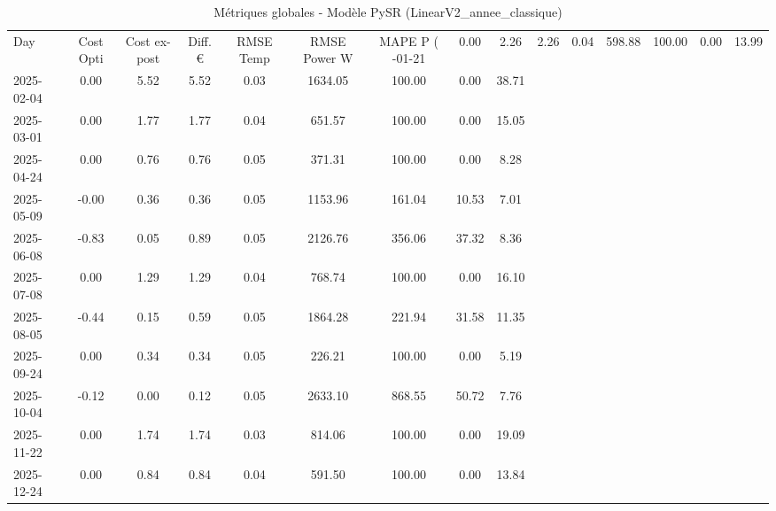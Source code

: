 \begin{table}
\caption{Métriques globales - Modèle PySR (LinearV2_annee_classique)}
\label{tab:PySR_LinearV2_annee_classique_Validation_EPlus_VS_Opti}
\begin{small}
\begin{tabular}{lcccccccc}
\toprule
Day & Cost Opti & Cost ex-post & Diff. € & RMSE Temp & RMSE Power W & MAPE P (%
-01-21 & 0.00 & 2.26 & 2.26 & 0.04 & 598.88 & 100.00 & 0.00 & 13.99 \\
2025-02-04 & 0.00 & 5.52 & 5.52 & 0.03 & 1634.05 & 100.00 & 0.00 & 38.71 \\
2025-03-01 & 0.00 & 1.77 & 1.77 & 0.04 & 651.57 & 100.00 & 0.00 & 15.05 \\
2025-04-24 & 0.00 & 0.76 & 0.76 & 0.05 & 371.31 & 100.00 & 0.00 & 8.28 \\
2025-05-09 & -0.00 & 0.36 & 0.36 & 0.05 & 1153.96 & 161.04 & 10.53 & 7.01 \\
2025-06-08 & -0.83 & 0.05 & 0.89 & 0.05 & 2126.76 & 356.06 & 37.32 & 8.36 \\
2025-07-08 & 0.00 & 1.29 & 1.29 & 0.04 & 768.74 & 100.00 & 0.00 & 16.10 \\
2025-08-05 & -0.44 & 0.15 & 0.59 & 0.05 & 1864.28 & 221.94 & 31.58 & 11.35 \\
2025-09-24 & 0.00 & 0.34 & 0.34 & 0.05 & 226.21 & 100.00 & 0.00 & 5.19 \\
2025-10-04 & -0.12 & 0.00 & 0.12 & 0.05 & 2633.10 & 868.55 & 50.72 & 7.76 \\
2025-11-22 & 0.00 & 1.74 & 1.74 & 0.03 & 814.06 & 100.00 & 0.00 & 19.09 \\
2025-12-24 & 0.00 & 0.84 & 0.84 & 0.04 & 591.50 & 100.00 & 0.00 & 13.84 \\
\bottomrule
\end{tabular}
\end{small}
\end{table}
